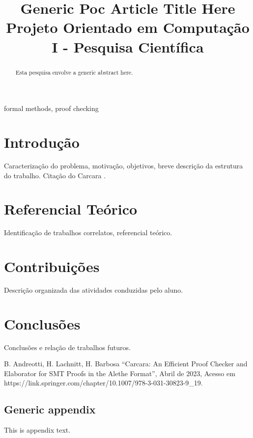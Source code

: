 \documentclass[conference]{IEEEtran}
\begin{document}
\title{Generic Poc Article Title Here\\
{\footnotesize Projeto Orientado em Computação I - Pesquisa Científica}
}

\author{
}

\maketitle

\begin{abstract}
    Esta pesquisa envolve a generic abstract here.
\end{abstract}

\begin{IEEEkeywords}
    formal methods, proof checking
\end{IEEEkeywords}

\section{Introdução}
Caracterização do problema, motivação, objetivos, breve
descrição da estrutura do trabalho.
Citação do Carcara \cite{Carcara}.

\section{Referencial Teórico}
Identificação de trabalhos correlatos, referencial teórico.

\section{Contribuições}
Descrição organizada das atividades conduzidas pelo aluno.

\section*{Conclusões}
Conclusões e relação de trabalhos futuros.

\begin{thebibliography}{00}
           B. Andreotti, H. Lachnitt, H. Barbosa ``Carcara: An Efficient Proof Checker and Elaborator for SMT Proofs in the Alethe Format'', Abril de 2023, Acesso em https://link.springer.com/chapter/10.1007/978-3-031-30823-9\_19.
\end{thebibliography}

\newpage
\onecolumn
\appendix

\subsection{Generic appendix}
This is appendix text.
\end{document}
